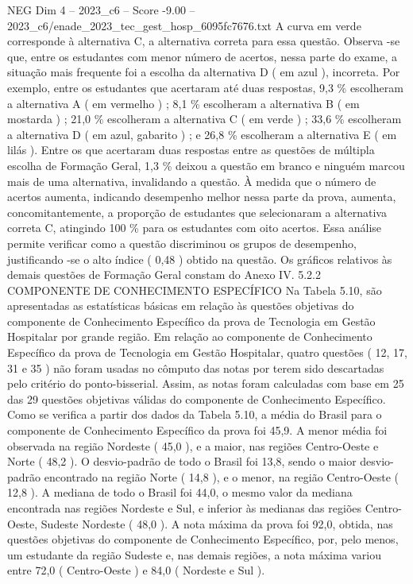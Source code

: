 \begin{textsample}{NEG Dim 4 – 2023\_c6 – Score -9.00 – 2023\_c6/enade\_2023\_tec\_gest\_hosp\_6095fc7676.txt}
A curva em verde corresponde à alternativa C, a alternativa correta para essa questão.
Observa -se que, entre os estudantes com menor número de acertos, nessa parte do exame, a situação mais frequente foi a escolha da alternativa D ( em azul ), incorreta.
Por exemplo, entre os estudantes que acertaram até duas respostas, 9,3 \% escolheram a alternativa A ( em vermelho ) ; 8,1 \% escolheram a alternativa B ( em mostarda ) ; 21,0 \% escolheram a alternativa C ( em verde ) ; 33,6 \% escolheram a alternativa D ( em azul, gabarito ) ; e 26,8 \% escolheram a alternativa E ( em lilás ).
Entre os que acertaram duas respostas entre as questões de múltipla escolha de Formação Geral, 1,3 \% deixou a questão em branco e ninguém marcou mais de uma alternativa, invalidando a questão.
À medida que o número de acertos aumenta, indicando desempenho melhor nessa parte da prova, aumenta, concomitantemente, a proporção de estudantes que selecionaram a alternativa correta C, atingindo 100 \% para os estudantes com oito acertos.
Essa análise permite verificar como a questão discriminou os grupos de desempenho, justificando -se o alto índice ( 0,48 ) obtido na questão.
Os gráficos relativos às demais questões de Formação Geral constam do Anexo IV. 5.2.2 COMPONENTE DE CONHECIMENTO ESPECÍFICO Na Tabela 5.10, são apresentadas as estatísticas básicas em relação às questões objetivas do componente de Conhecimento Específico da prova de Tecnologia em Gestão Hospitalar por grande região.
Em relação ao componente de Conhecimento Específico da prova de Tecnologia em Gestão Hospitalar, quatro questões ( 12, 17, 31 e 35 ) não foram usadas no cômputo das notas por terem sido descartadas pelo critério do ponto-bisserial.
Assim, as notas foram calculadas com base em 25 das 29 questões objetivas válidas do componente de Conhecimento Específico.
Como se verifica a partir dos dados da Tabela 5.10, a média do Brasil para o componente de Conhecimento Específico da prova foi 45,9.
A menor média foi observada na região Nordeste ( 45,0 ), e a maior, nas regiões Centro-Oeste e Norte ( 48,2 ).
O desvio-padrão de todo o Brasil foi 13,8, sendo o maior desvio-padrão encontrado na região Norte ( 14,8 ), e o menor, na região Centro-Oeste ( 12,8 ).
A mediana de todo o Brasil foi 44,0, o mesmo valor da mediana encontrada nas regiões Nordeste e Sul, e inferior às medianas das regiões Centro-Oeste, Sudeste Nordeste ( 48,0 ).
A nota máxima da prova foi 92,0, obtida, nas questões objetivas do componente de Conhecimento Específico, por, pelo menos, um estudante da região Sudeste e, nas demais regiões, a nota máxima variou entre 72,0 ( Centro-Oeste ) e 84,0 ( Nordeste e Sul ).

\end{textsample}
